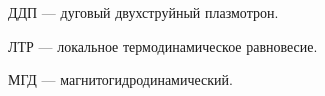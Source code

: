 

ДДП — дуговый двухструйный плазмотрон.

ЛТР — локальное термодинамическое равновесие.

МГД — магнитогидродинамический.
